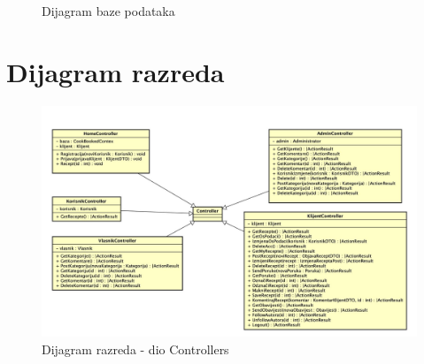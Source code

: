 			\begin{figure}[H]
				\centering
				\caption{Dijagram baze podataka}
				\label{fig:bpdiag}
			\end{figure}
			
			
		\section{Dijagram razreda}
		
		\begin{figure}[H]
			\includegraphics[scale=0.32]{dijagrami/razdijag_controller.jpeg} 
			\centering
			\caption{Dijagram razreda - dio Controllers}
			\label{fig:bpdiag}
		\end{figure}

		\eject

